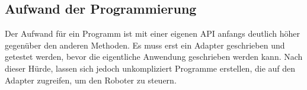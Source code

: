 \subsection{Aufwand der Programmierung}
\label{eigene_api_aufwand}

Der Aufwand für ein Programm ist mit einer eigenen API anfangs deutlich höher gegenüber den anderen Methoden. Es muss erst ein Adapter geschrieben und getestet werden, bevor die eigentliche Anwendung geschrieben werden kann. 
Nach dieser Hürde, lassen sich jedoch unkompliziert Programme erstellen, die auf den Adapter zugreifen, um den Roboter zu steuern.